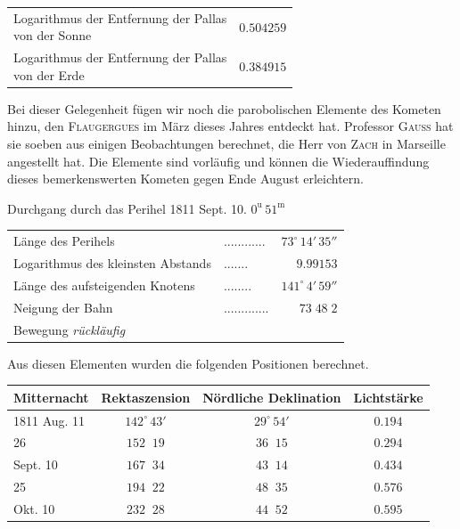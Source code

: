\begin{center}\fontsize{10}{12}\selectfont\setlength{\tabcolsep}{4pt}\renewcommand{\arraystretch}{1.15}\begin{tabular}{lr}
\shortstack[l]{Logarithmus der Entfernung der Pallas\\von der Sonne} & $0.504259$\\
\shortstack[l]{Logarithmus der Entfernung der Pallas\\von der Erde} & $0.384915$\\
\end{tabular}\end{center}

\par\indent Bei dieser Gelegenheit fügen wir noch die parobolischen Elemente des Kometen hinzu, den \textsc{Flaugergues} im März dieses Jahres entdeckt hat. Professor \textsc{Gauss} hat sie soeben aus einigen Beobachtungen berechnet, die Herr von \textsc{Zach} in Marseille angestellt hat. Die Elemente sind vorläufig und können die Wiederauffindung dieses bemerkenswerten Kometen gegen Ende August erleichtern.
\begin{center}Durchgang durch das Perihel 1811 Sept. 10. $0^{\mathrm u}\,51^{\mathrm m}$\end{center}

\begin{center}\fontsize{10}{12}\selectfont\setlength{\tabcolsep}{4pt}\renewcommand{\arraystretch}{1.15}\begin{tabular}{llr}
Länge des Perihels & .\;.\;.\;.\;.\;.\;.\;.\;.\;.\;.\;. & $73^\circ\,14'\,35''$\\
Logarithmus des kleinsten Abstands & .\;.\;.\;.\;.\;.\;. & $9.99153$\\
Länge des aufsteigenden Knotens & .\;.\;.\;.\;.\;.\;.\;. & $141^\circ\,4'\,59''$\\
Neigung der Bahn & .\;.\;.\;.\;.\;.\;.\;.\;.\;.\;.\;.\;. & $73\;48\;2$\\
Bewegung \emph{rückläufig} &  & \\
\end{tabular}\end{center}

\par\indent Aus diesen Elementen wurden die folgenden Positionen berechnet.
\begin{center}\fontsize{10}{12}\selectfont\setlength{\tabcolsep}{4pt}\renewcommand{\arraystretch}{1.15}
\begin{tabular}{l|cc|c}
Mitternacht & Rektaszension & Nördliche Deklination & Lichtstärke \\
\hline
1811 Aug. 11 & $142^\circ\,43'$ & $29^\circ\,54'$ & $0.194$ \\
\phantom{1811 }\phantom{Aug. }26 & $152\;\;19$ & $36\;\;15$ & $0.294$ \\
Sept. 10 & $167\;\;34$ & $43\;\;14$ & $0.434$ \\
\phantom{Sept. }25 & $194\;\;22$ & $48\;\;35$ & $0.576$ \\
Okt. 10 & $232\;\;28$ & $44\;\;52$ & $0.595$ \\
\end{tabular}
\end{center}



